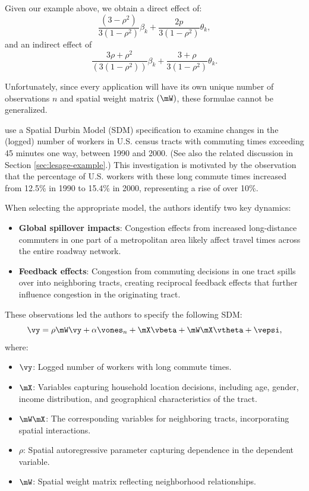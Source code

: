 \documentclass[english,12pt]{book}\usepackage[]{graphicx}\usepackage[]{xcolor}
\begin{document}
Given our example above, we obtain a direct effect of:
\begin{equation*}
  \frac{(3- \rho^2)}{3(1 - \rho^2)}\beta_k + \frac{2p}{3(1-\rho^2)}\theta_k,
\end{equation*}
%
and an indirect effect of
\begin{equation*}
  \frac{3\rho + \rho^2}{(3(1-\rho^2))}\beta_k + \frac{3 + \rho}{3(1- \rho^2)}\theta_k.
\end{equation*}

Unfortunately, since every application will have its own unique number of observations $n$ and spatial weight matrix $(\mW)$, these formulae cannot be generalized. 


\begin{example}\label{example:commuting-Kirby}
\citet{kirby2009changes} use a Spatial Durbin Model (SDM) specification to examine changes in the (logged) number of workers in U.S. census tracts with commuting times exceeding 45 minutes one way, between 1990 and 2000. (See also the related discussion in Section \ref{sec:lesage-example}.) This investigation is motivated by the observation that the percentage of U.S. workers with these long commute times increased from 12.5\% in 1990 to 15.4\% in 2000, representing a rise of over 10\%. 

When selecting the appropriate model, the authors identify two key dynamics:
\begin{itemize}
    \item \textbf{Global spillover impacts}: Congestion effects from increased long-distance commuters in one part of a metropolitan area likely affect travel times across the entire roadway network.
    \item \textbf{Feedback effects}: Congestion from commuting decisions in one tract spills over into neighboring tracts, creating reciprocal feedback effects that further influence congestion in the originating tract.
\end{itemize}

These observations led the authors to specify the following SDM:
\begin{equation*}
    \vy = \rho \mW \vy + \alpha \vones_n + \mX \vbeta + \mW\mX \vtheta + \vepsi,
\end{equation*}
where:
\begin{itemize}
    \item \(\vy\): Logged number of workers with long commute times.
    \item \(\mX\): Variables capturing household location decisions, including age, gender, income distribution, and geographical characteristics of the tract.
    \item \(\mW \mX\): The corresponding variables for neighboring tracts, incorporating spatial interactions.
    \item \(\rho\): Spatial autoregressive parameter capturing dependence in the dependent variable.
    \item \(\mW\): Spatial weight matrix reflecting neighborhood relationships.
\end{itemize}


\end{example}
\end{document}
